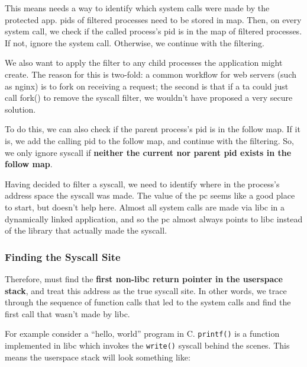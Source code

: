 This means \af needs a way to identify which system calls were made by the
protected app. \acp{pid} of filtered processes
need to be stored in  map. Then, on every system call, we check if the
called process's \ac{pid} is in the map of filtered processes. If not, ignore
the system call. Otherwise, we continue with the filtering.

We also want to apply the filter to any child processes the
application might create. The reason for this is two-fold: a common workflow for
web servers (such as nginx) is to fork on receiving a request; the second is
that if a \ac{ta} could just call fork() to remove the syscall filter, we
wouldn't have proposed a very secure solution.

To do this, we can also check if the parent process's \ac{pid} is in the follow
map. If it is, we add the calling \ac{pid} to the follow map, and continue with
the filtering. So, we only ignore syscall if \textbf{neither the current nor
parent \ac{pid} exists in the follow map}.

Having decided to filter a syscall, we need to identify where in the process's
address space the syscall was made. The value of the \ac{pc} seems like a good
place to start, but doesn't help here.
Almost all system calls are made via \ac{libc} in a dynamically linked 
application, and so the \ac{pc} almost always points to \ac{libc} instead of the
library that actually made the syscall.

\subsubsection{Finding the Syscall Site}\label{subsubsec:find_syscall}

Therefore, \af must find the \textbf{first non-\ac{libc} return pointer in the
userspace stack}, and treat this address as the true syscall site. In other
words, we trace through the sequence of function calls that led to the system
calls and find the first call that wasn't made by libc.

For example consider a ``hello, world'' program in C. \texttt{printf()} is a 
function implemented in \ac{libc} which invokes the \texttt{write()} syscall
behind the scenes. This means the userspace stack will look something like:



